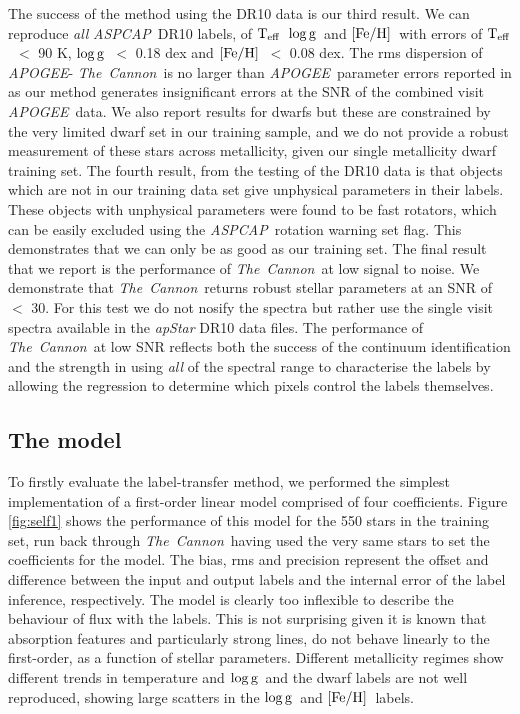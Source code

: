 \documentclass[12pt, preprint]{aastex}
\newcommand{\teff}{\mbox{$\rm T_{eff}$}}
\newcommand{\feh}{\mbox{$\rm [Fe/H]$}}
\newcommand{\logg}{\mbox{$\rm \log g$}}
\newcommand{\tc}{\textsl{The~Cannon}}
\newcommand{\apogee}{\textsl{APOGEE}}
\newcommand{\aspcap}{\textsl{ASPCAP}}
\begin{document}
The success of the method using the DR10 data is our third result. We can reproduce \textit{all} \aspcap\ DR10 labels, of \teff\, \logg\ and \feh\ with errors of \teff\ $<$ 90 K, \logg\ $<$ 0.18 dex and \feh\ $<$ 0.08 dex. The rms dispersion of \apogee - \tc\ is no larger than \apogee\ parameter errors reported in \citep{Meszaros} as our method generates insignificant errors at the SNR of the combined visit \apogee\ data. We also report results for dwarfs but these are constrained by the very limited dwarf set in our training sample, and we do not provide a robust measurement of these stars across metallicity, given our single metallicity dwarf training set. The fourth result, from the testing of the DR10 data is that objects which are not in our training data set give unphysical parameters in their labels. These objects with unphysical parameters were found to be fast rotators, which can be easily excluded using the \aspcap\ rotation warning set flag. This demonstrates that we can only be as good as our training set. The final result that we report is the performance of \tc\ at low signal to noise. We demonstrate that \tc\ returns robust stellar parameters at an SNR of $<$ 30. For this test we do not nosify the spectra but rather use the single visit spectra available in the \textit{apStar} DR10 data files. The performance of \tc\ at low SNR reflects both the success of the continuum identification and the strength in using \textit{all} of the spectral range to characterise the labels by allowing the regression to determine which pixels control the labels themselves.


\subsection{The model} 

To firstly evaluate the label-transfer method, we performed the simplest implementation of a first-order linear model comprised of four coefficients. Figure \ref{fig:self1} shows the performance of this model for the 550 stars in the training set, run back through \tc\, having used the very same stars to set the coefficients for the model. The bias, rms and precision represent the offset and difference between the input and output labels and the internal error of the label inference, respectively. The model is clearly too inflexible to describe the behaviour of flux with the labels. This is not surprising given it is known that absorption features and particularly strong lines, do not behave linearly to the first-order, as a function of stellar parameters. Different metallicity regimes show different trends in  temperature and \logg\ and the dwarf labels are not well reproduced, showing large scatters in the \logg\ and \feh\ labels. 
\end{document}
